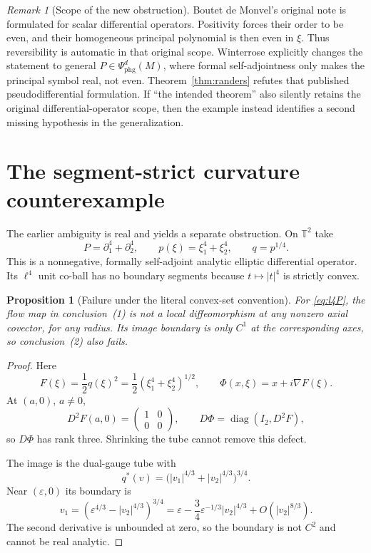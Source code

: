 \documentclass[11pt]{article}
\newtheorem{proposition}{Proposition}
\theoremstyle{remark}
\newtheorem{remark}{Remark}
\newcommand{\T}{\mathbb T}
\newcommand{\eps}{\varepsilon}
\begin{document}
\begin{remark}[Scope of the new obstruction]
Boutet de Monvel's original note is formulated for scalar differential
operators.  Positivity forces their order to be even, and their homogeneous
principal polynomial is then even in $\xi$.  Thus reversibility is automatic
in that original scope.  Winterrose explicitly changes the statement to
general $P\in\Psi^d_{\mathrm{phg}}(M)$, where formal self-adjointness only
makes the principal symbol real, not even.  Theorem~\ref{thm:randers} refutes
that published pseudodifferential formulation.  If ``the intended theorem''
also silently retains the original differential-operator scope, then the
example instead identifies a second missing hypothesis in the generalization.
\end{remark}

\section{The segment-strict curvature counterexample}

The earlier ambiguity is real and yields a separate obstruction.  On $\T^2$
take
\begin{equation}\label{eq:l4P}
 P=\partial_1^4+\partial_2^4,
 \qquad p(\xi)=\xi_1^4+\xi_2^4,
 \qquad q=p^{1/4}.
\end{equation}
This is a nonnegative, formally self-adjoint analytic elliptic differential
operator.  Its $\ell^4$ unit co-ball has no boundary segments because
$t\mapsto|t|^4$ is strictly convex.

\begin{proposition}[Failure under the literal convex-set convention]
For \eqref{eq:l4P}, the flow map in conclusion~\textnormal{(1)} is not a local
diffeomorphism at any nonzero axial covector, for any radius.  Its image
boundary is only $C^1$ at the corresponding axes, so conclusion~\textnormal{(2)}
also fails.
\end{proposition}

\begin{proof}
Here
\[
 F(\xi)=\frac12q(\xi)^2
 =\frac12(\xi_1^4+\xi_2^4)^{1/2},
 \qquad \Phi(x,\xi)=x+i\nabla F(\xi).
\]
At $(a,0)$, $a\neq0$,
\[
 D^2F(a,0)=\begin{pmatrix}1&0\\0&0\end{pmatrix},
 \qquad
 D\Phi=\operatorname{diag}(I_2,D^2F),
\]
so $D\Phi$ has rank three.  Shrinking the tube cannot remove this defect.

The image is the dual-gauge tube with
\[
 q^*(v)=\bigl(|v_1|^{4/3}+|v_2|^{4/3}\bigr)^{3/4}.
\]
Near $(\eps,0)$ its boundary is
\[
 v_1=(\eps^{4/3}-|v_2|^{4/3})^{3/4}
 =\eps-\frac34\eps^{-1/3}|v_2|^{4/3}
 +O(|v_2|^{8/3}).
\]
The second derivative is unbounded at zero, so the boundary is not $C^2$ and
cannot be real analytic.
\end{proof}
\end{document}
